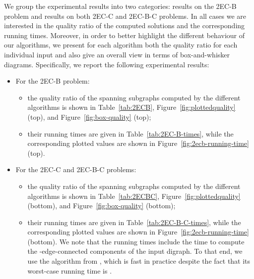 \documentclass[11pt]{article}
\begin{document}
We group the experimental results into two categories: results on the \textsf{2EC-B} problem and results on both \textsf{2EC-C} and \textsf{2EC-B-C} problems.
In all cases we are interested in the quality ratio of the computed solutions and the corresponding running times.
Moreover, in order to better highlight the different behaviour of our algorithms, we present for each algorithm both the quality ratio for each individual input and also give
an overall view in terms of box-and-whisker diagrams.
Specifically, we report the following experimental results:
\begin{itemize}
\item For the \textsf{2EC-B} problem:
\begin{itemize}
\item the quality ratio of the spanning  subgraphs computed by the different algorithms is shown in Table~\ref{tab:2ECB}, Figure~\ref{fig:plottedquality} (top), and Figure~\ref{fig:box-quality} (top);
\item their running times are given in Table~\ref{tab:2EC-B-times}, while the corresponding plotted values are shown in Figure~\ref{fig:2ecb-running-time} (top).
\end{itemize}
\item For the \textsf{2EC-C} and \textsf{2EC-B-C} problems:
\begin{itemize}
\item the quality ratio of the spanning  subgraphs computed by the different algorithms is shown in Table~\ref{tab:2ECBC}, Figure~\ref{fig:plottedquality} (bottom), and Figure~\ref{fig:box-quality} (bottom);
\item their running times are given in Table~\ref{tab:2EC-B-C-times}, while the corresponding plotted values are shown in Figure~\ref{fig:2ecb-running-time} (bottom). 
We note that the running times include the time to compute the -edge-connected components of the input digraph. 
To that end, we use the algorithm from \cite{2ECB-Exp}, which is fast in practice despite the fact that its worst-case running time is .
\end{itemize}
\end{itemize}
\end{document}
